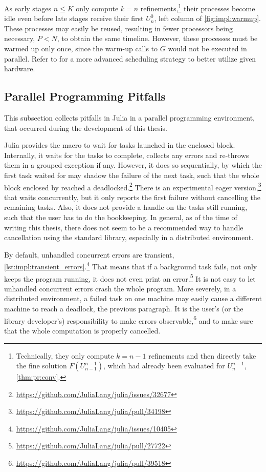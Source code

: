 As early stages $n \leq K$ only compute $k=n$ refinements,\footnote{%
  Technically, they only compute $k=n-1$ refinements and then directly take the fine solution $F(U_{n-1}^{n-1})$,
  which had already been evaluated for $U_n^{n-1}$,
  \cf \autoref{thm:pr:conv}.
}
their processes become idle even before late stages receive their first $U^0_n$,
\cf \eg left column of \autoref{fig:impl:warmup}.
These processes may easily be reused,
resulting in fewer processors being necessary, $P < N$,
to obtain the same timeline.
However, these processes must be warmed up only once,
since the warm-up calls to $G$ would not be executed in parallel.
Refer to \eg \cite{Nielsen2018} for a more advanced scheduling strategy to better utilize given hardware.

\subsection{Parallel Programming Pitfalls}

This subsection collects pitfalls in Julia in a parallel programming environment,
that occurred during the development of this thesis.

Julia provides the  macro to wait for tasks launched in the enclosed block.
Internally, it waits for the tasks to complete,
collects any errors and re-throws them in a grouped exception if any.
However, it does so sequentially,
by which the first task waited for may shadow the failure of the next task,
such that the whole block enclosed by  reached a deadlocked.\footnote{%
  \url{https://github.com/JuliaLang/julia/issues/32677}}
There is an experimental eager version,\footnote{%
  \url{https://github.com/JuliaLang/julia/pull/34198}}
that waits concurrently,
but it only reports the first failure without cancelling the remaining tasks.
Also, it does not provide a handle on the tasks still running,
such that the user has to do the bookkeeping.
In general, as of the time of writing this thesis,
there does not seem to be a recommended way to handle cancellation using the standard library,
especially in a distributed environment.

By default, unhandled concurrent errors are transient,
\cf \autoref{lst:impl:transient_errors}.\footnote{%
  \url{https://github.com/JuliaLang/julia/issues/10405}}
That means that if a background task fails,
not only keeps the program running,
it does not even print an error.\footnote{%
  \url{https://github.com/JuliaLang/julia/pull/27722}}
It is not easy to let unhandled concurrent errors crash the whole program.
More severely, in a distributed environment,
a failed task on one machine may easily cause a different machine to reach a deadlock,
\cf the previous paragraph.
It is the user's (or the library developer's) responsibility to make errors observable,\footnote{%
  \url{https://github.com/JuliaLang/julia/pull/39518}}
and to make sure that the whole computation is properly cancelled.

